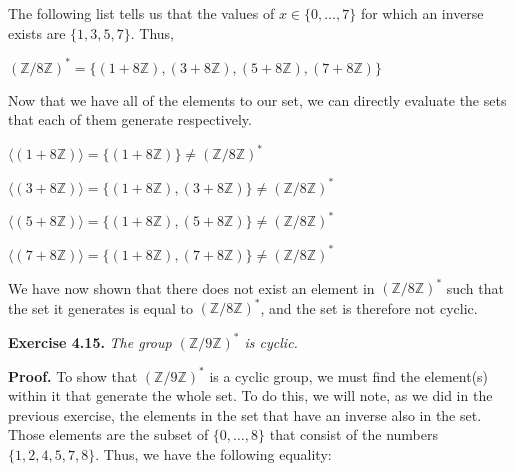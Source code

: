 \documentclass[12pt, a4paper]{article}
\begin{document}
\begin{flushleft}
\vspace{6mm}
\begin{flushleft}
The following list tells us that the values of $x\in\{0, \ldots, 7\}$ for which an inverse exists are $\{1, 3, 5, 7\}$. Thus,
\end{flushleft}

\vspace{6mm}
\centerline{$(\mathbb{Z}/8\mathbb{Z})^{*}=\{(1+8\mathbb{Z}), (3+8\mathbb{Z}), (5+8\mathbb{Z}), (7+8\mathbb{Z})\}$}
\vspace{6mm}
 
\begin{flushleft}
Now that we have all of the elements to our set, we can directly evaluate the sets that each of them generate respectively. 
\end{flushleft}

\vspace{6mm}
\centerline{$\langle(1+8\mathbb{Z})\rangle=\{(1+8\mathbb{Z})\}\neq(\mathbb{Z}/8\mathbb{Z})^{*}$}\hfil
\vspace{2mm}
\centerline{$\langle(3+8\mathbb{Z})\rangle=\{(1+8\mathbb{Z}), (3+8\mathbb{Z})\}\neq(\mathbb{Z}/8\mathbb{Z})^{*}$}\hfil
\vspace{7mm}
\centerline{$\langle(5+8\mathbb{Z})\rangle=\{(1+8\mathbb{Z}), (5+8\mathbb{Z})\}\neq(\mathbb{Z}/8\mathbb{Z})^{*}$}\hfil
\vspace{7mm}
\centerline{$\langle(7+8\mathbb{Z})\rangle=\{(1+8\mathbb{Z}), (7+8\mathbb{Z})\}\neq(\mathbb{Z}/8\mathbb{Z})^{*}$}\hfil
\vspace{6mm}

\begin{flushleft}
We have now shown that there does not exist an element in $(\mathbb{Z}/8\mathbb{Z})^{*}$ such that the set it generates is equal to $(\mathbb{Z}/8\mathbb{Z})^{*}$, and the set is therefore not cyclic.
\end{flushleft}

\vspace{26mm}
\hspace{2mm}\textbf{Exercise 4.15.} \it The group $(\mathbb{Z}/9\mathbb{Z})^{*}$ is cyclic.
\vspace{10mm}

\hspace{2mm}\textbf{Proof.} \rm To show that $(\mathbb{Z}/9\mathbb{Z})^{*}$ is a cyclic group, we must find the element(s) within it that generate the whole set. To do this, we will note, as we did in the previous exercise, the elements in the set that have an inverse also in the set. Those elements are the subset of $\{0, \ldots, 8\}$ that consist of the numbers $\{1, 2, 4, 5, 7, 8\}$. Thus, we have the following equality:\hfil


\end{flushleft}
\end{document}
